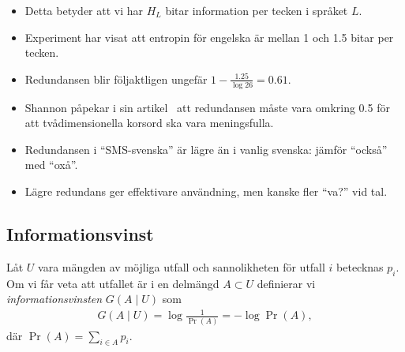 \documentclass{beamer}
\begin{document}
\begin{frame}
  \begin{itemize}
    \item Detta betyder att vi har \(H_L\) bitar information per tecken 
      i språket \(L\).

    \item Experiment har visat att entropin för engelska är mellan 1 och 1.5 
      bitar per tecken.

    \item Redundansen blir följaktligen ungefär \(1 - \frac{1.25}{\log 26} 
      = 0.61\).

    \item Shannon påpekar i sin artikel~\cite{Shannon1948amt} att redundansen 
      måste vara omkring 0.5 för att tvådimensionella korsord ska vara 
      meningsfulla.

    \item Redundansen i \enquote{SMS-svenska} är lägre än i vanlig svenska: 
      jämför \enquote{också} med \enquote{oxå}.

    \item Lägre redundans ger effektivare användning, men kanske fler 
      \enquote{va?} vid tal.

  \end{itemize}
\end{frame}

%
%
%

\subsection{Informationsvinst}

\begin{frame}
  \begin{definition}
    Låt \(U\) vara mängden av möjliga utfall och sannolikheten för utfall \(i\) 
    betecknas \(p_i\).
    Om vi får veta att utfallet är i en delmängd \(A\subset U\) definierar vi 
    \emph{informationsvinsten} \(G(A\mid U)\) som
    \begin{align*}
      G(A\mid U) = \log\frac{1}{\Pr(A)} = -\log\Pr(A),
    \end{align*}
    där \(\Pr(A) = \sum_{i\in A} p_i\).
  \end{definition}
\end{frame}
\end{document}
